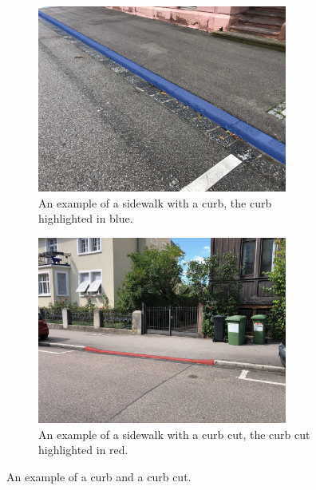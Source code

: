 \begin{figure}
    \centering
    \begin{subfigure}{0.45\textwidth}
    	\centering
    	\includegraphics[width=0.9\textwidth]{figures/background/curb.jpeg} %
    	\caption{An example of a sidewalk with a curb, the curb highlighted in blue.} \label{fig:background-curb}
    \end{subfigure}
	\hfill
    \begin{subfigure}{0.45\textwidth}
        \centering
        \includegraphics[width=0.9\textwidth]{figures/background/curbcut.jpeg} %
        \caption{An example of a sidewalk with a curb cut, the curb cut highlighted in red.} \label{fig:background-curbcut}
    \end{subfigure}
	\caption[Curbs and curb cuts]{An example of a curb and a curb cut.}
\end{figure}